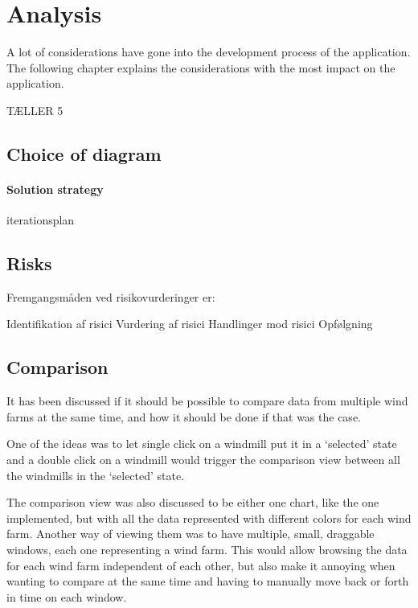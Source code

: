 \chapter{Analysis}
\label{sec:analysis}
A lot of considerations have gone into the development process of the application. The following chapter explains the considerations with the most impact on the application.

TÆLLER 5

\section{Choice of diagram}
\label{sec:the_data}




\subsubsection{Solution strategy}
\label{sec:analysis_timezones}

iterationsplan

\section{Risks}
\label{sec:graphical_user_interface}

Fremgangsmåden ved risikovurderinger er:

    Identifikation af risici
    Vurdering af risici
    Handlinger mod risici
    Opfølgning


\section{Comparison}
\label{sec:comparison}
It has been discussed if it should be possible to compare data from multiple wind farms at the same time, and how it should be done if that was the case.

One of the ideas was to let single click on a windmill put it in a `selected' state and a double click on a windmill would trigger the comparison view between all the windmills in the `selected' state.

The comparison view was also discussed to be either one chart, like the one implemented, but with all the data represented with different colors for each wind farm.
Another way of viewing them was to have multiple, small, draggable windows, each one representing a wind farm. This would allow browsing the data for each wind farm independent of each other, but also make it annoying when wanting to compare at the same time and having to manually move back or forth in time on each window.

